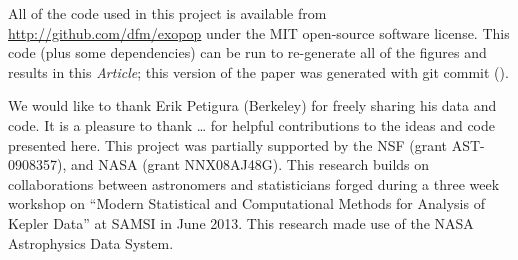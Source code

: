 \documentclass[12pt,preprint]{aastex}
\newcommand{\project}[1]{{\sffamily #1}}
\newcommand{\kepler}{\project{Kepler}}
\newcommand{\paper}{\textsl{Article}}
\begin{document}

All of the code used in this project is available from
\url{http://github.com/dfm/exopop} under the MIT open-source software license.
This code (plus some dependencies) can be run to re-generate all of the
figures and results in this \paper; this version of the paper was generated
with git commit \texttt{\githash} (\gitdate).

\acknowledgments
We would like to thank Erik Petigura (Berkeley) for freely sharing his data
and code.
It is a pleasure to thank
\ldots
for helpful contributions to the ideas and code presented here.
This project was partially supported by the NSF (grant AST-0908357), and NASA
(grant NNX08AJ48G).
This research builds on collaborations between astronomers and statisticians
forged during a three week workshop on ``Modern Statistical and Computational
Methods for Analysis of Kepler Data'' at SAMSI in June 2013.
This research made use of the NASA \project{Astrophysics Data System}.
\end{document}
